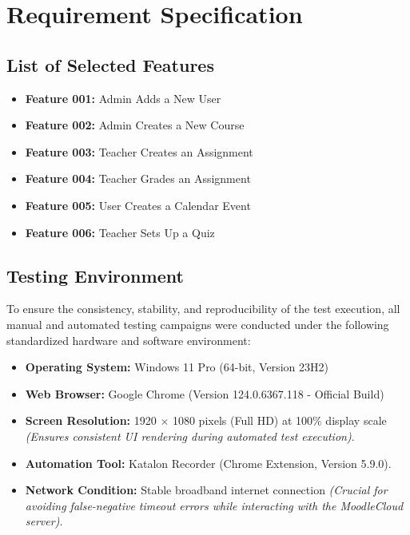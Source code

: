 \documentclass[twoside,final]{hcmut-report}
\begin{document}
\section{Requirement Specification}

\subsection{List of Selected Features}
\begin{itemize}
    \item \textbf{Feature 001:} Admin Adds a New User
    \item \textbf{Feature 002:} Admin Creates a New Course
    \item \textbf{Feature 003:} Teacher Creates an Assignment
    \item \textbf{Feature 004:} Teacher Grades an Assignment
    \item \textbf{Feature 005:} User Creates a Calendar Event
    \item \textbf{Feature 006:} Teacher Sets Up a Quiz
\end{itemize}

\subsection{Testing Environment}
To ensure the consistency, stability, and reproducibility of the test execution, all manual and automated testing campaigns were conducted under the following standardized hardware and software environment:

\begin{itemize}
    \item \textbf{Operating System:} Windows 11 Pro (64-bit, Version 23H2)
    \item \textbf{Web Browser:} Google Chrome (Version 124.0.6367.118 - Official Build)
    \item \textbf{Screen Resolution:} 1920 $\times$ 1080 pixels (Full HD) at 100\% display scale \textit{(Ensures consistent UI rendering during automated test execution)}.
    \item \textbf{Automation Tool:} Katalon Recorder (Chrome Extension, Version 5.9.0).
    \item \textbf{Network Condition:} Stable broadband internet connection \textit{(Crucial for avoiding false-negative timeout errors while interacting with the MoodleCloud server)}.
\end{itemize}
\end{document}
